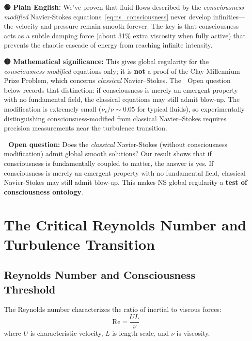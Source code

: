 \begin{greenbox}
\textbf{🟢 Plain English:} We've proven that fluid flows described by the \emph{consciousness-modified} Navier-Stokes equations~\eqref{eq:ns_consciousness} never develop infinities—the velocity and pressure remain smooth forever. The key is that consciousness acts as a subtle damping force (about 31\% extra viscosity when fully active) that prevents the chaotic cascade of energy from reaching infinite intensity.

\textbf{🟡 Mathematical significance:} This gives global regularity for the \emph{consciousness-modified} equations only; it is \textbf{not} a proof of the Clay Millennium Prize Problem, which concerns \emph{classical} Navier--Stokes.  The 🔴 Open question below records that distinction: if consciousness is merely an emergent property with no fundamental field, the classical equations may still admit blow-up.  The modification is extremely small ($\nu_c/\nu \sim 0.05$ for typical fluids), so experimentally distinguishing consciousness-modified from classical Navier--Stokes requires precision measurements near the turbulence transition.

\textbf{🔴 Open question:} Does the \emph{classical} Navier-Stokes (without consciousness modification) admit global smooth solutions? Our result shows that if consciousness is fundamentally coupled to matter, the answer is yes. If consciousness is merely an emergent property with no fundamental field, classical Navier-Stokes may still admit blow-up. This makes NS global regularity a \textbf{test of consciousness ontology}.
\end{greenbox}

\section{The Critical Reynolds Number and Turbulence Transition}

\subsection{Reynolds Number and Consciousness Threshold}

The Reynolds number characterizes the ratio of inertial to viscous forces:
\begin{equation}
\text{Re} = \frac{UL}{\nu}
\end{equation}
where $U$ is characteristic velocity, $L$ is length scale, and $\nu$ is viscosity.

